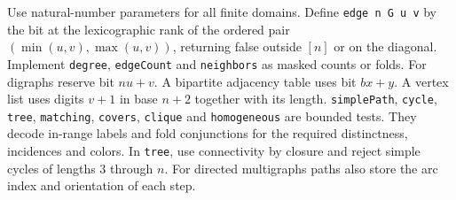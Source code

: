 Use natural-number parameters for all finite domains. Define \texttt{edge n G u v} by the bit at the lexicographic rank of the ordered pair $(\min(u,v),\max(u,v))$, returning false outside $[n]$ or on the diagonal. Implement \texttt{degree}, \texttt{edgeCount} and \texttt{neighbors} as masked counts or folds. For digraphs reserve bit $nu+v$. A bipartite adjacency table uses bit $bx+y$. A vertex list uses digits $v+1$ in base $n+2$ together with its length. \texttt{simplePath}, \texttt{cycle}, \texttt{tree}, \texttt{matching}, \texttt{covers}, \texttt{clique} and \texttt{homogeneous} are bounded tests. They decode in-range labels and fold conjunctions for the required distinctness, incidences and colors. In \texttt{tree}, use connectivity by closure and reject simple cycles of lengths $3$ through $n$. For directed multigraphs paths also store the arc index and orientation of each step.

